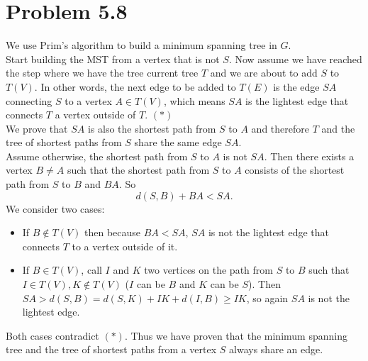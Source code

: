 \documentclass[12pt]{report}
\begin{document}
\section{Problem 5.8}
We use Prim's algorithm to build a minimum spanning tree in $G$. \\
Start building the MST from a vertex that is not $S$. Now assume we have reached the step where we have the tree current tree $T$ and we are about to add $S$ to $T(V)$. In other words, the next edge to be added to $T(E)$ is the edge $SA$ connecting $S$ to a vertex $A \in T(V)$, which means $SA$ is the lightest edge that connects $T$ a vertex outside of $T$. $(*)$\\
We prove that $SA$ is also the shortest path from $S$ to $A$ and therefore $T$ and the tree of shortest paths from $S$ share the same edge $SA$. \\
Assume otherwise, the shortest path from $S$ to $A$ is not $SA$. Then there exists a vertex $B \ne A$ such that the shortest path from $S$ to $A$ consists of the shortest path from $S$ to $B$ and $BA$. So $$d(S,B) + BA < SA.$$
We consider two cases:
\begin{itemize}
  \item If $B \notin T(V)$ then because $BA < SA$, $SA$ is not the lightest edge that connects $T$ to a vertex outside of it.
  \item If $B \in T(V)$, call $I$ and $K$ two vertices on the path from $S$ to $B$ such that $I \in T(V), K \notin T(V)$ ($I$ can be $B$ and $K$ can be $S$). Then $SA > d(S,B) = d(S,K) + IK + d(I,B) \ge IK$, so again $SA$ is not the lightest edge.
\end{itemize}
Both cases contradict $(*)$. Thus we have proven that the minimum spanning tree and the tree of shortest paths from a vertex $S$ always share an edge.
\end{document}
